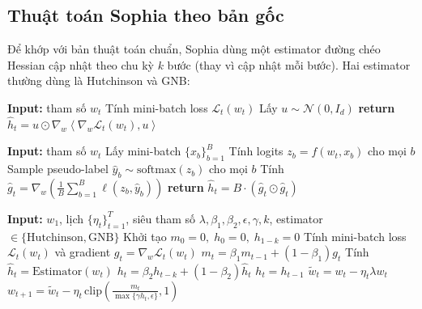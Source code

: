\documentclass[11pt]{article}
\begin{document}
\subsection{Thuật toán Sophia theo bản gốc}\label{sec:sophia_alg}
Để khớp với bản thuật toán chuẩn, Sophia dùng một estimator đường chéo Hessian cập nhật theo chu kỳ $k$ bước
(thay vì cập nhật mỗi bước). Hai estimator thường dùng là Hutchinson và GNB:

\begin{algorithm}[t]
\caption{Hutchinson$(w_t)$} 
\begin{algorithmic}[1]
\State \textbf{Input:} tham số $w_t$
\State Tính mini-batch loss $\mathcal{L}_t(w_t)$
\State Lấy $u \sim \mathcal{N}(0, I_d)$
\State \textbf{return} $\hat h_t = u \odot \nabla_w\!\left\langle \nabla_w \mathcal{L}_t(w_t), u \right\rangle$
\end{algorithmic}
\end{algorithm}

\begin{algorithm}[t]
\caption{Gauss--Newton--Bartlett (GNB)$(w_t)$}
\begin{algorithmic}[1]
\State \textbf{Input:} tham số $w_t$
\State Lấy mini-batch $\{x_b\}_{b=1}^B$
\State Tính logits $z_b = f(w_t,x_b)$ cho mọi $b$
\State Sample pseudo-label $\hat y_b \sim \mathrm{softmax}(z_b)$ cho mọi $b$
\State Tính $\hat g_t=\nabla_w\!\left(\frac{1}{B}\sum_{b=1}^{B}\ell(z_b,\hat y_b)\right)$
\State \textbf{return} $\hat h_t = B\cdot (\hat g_t \odot \hat g_t)$
\end{algorithmic}
\end{algorithm}

\begin{algorithm}[H]
\caption{Sophia$(w_1)$}
\begin{algorithmic}[1]
\State \textbf{Input:} $w_1$, lịch $\{\eta_t\}_{t=1}^{T}$, siêu tham số $\lambda,\beta_1,\beta_2,\epsilon,\gamma,k$, estimator $\in\{\text{Hutchinson},\text{GNB}\}$
\State Khởi tạo $m_0=0,\;h_0=0,\;h_{1-k}=0$
    \State Tính mini-batch loss $\mathcal{L}_t(w_t)$ và gradient $g_t=\nabla_w\mathcal{L}_t(w_t)$
    \State $m_t=\beta_1 m_{t-1}+(1-\beta_1)g_t$
        \State Tính $\hat h_t = \mathrm{Estimator}(w_t)$
        \State $h_t=\beta_2 h_{t-k} + (1-\beta_2)\hat h_t$
    \Else
        \State $h_t=h_{t-1}$
    \EndIf
    \State $\tilde w_t = w_t - \eta_t\lambda w_t$ 
    \State $w_{t+1}=\tilde w_t-\eta_t\,\mathrm{clip}\!\left(\frac{m_t}{\max\{\gamma h_t,\epsilon\}},1\right)$
\EndFor
\end{algorithmic}
\end{algorithm}
\end{document}
